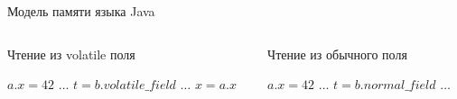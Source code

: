 \documentclass[usenames,dvipsnames,pdftex,unicode]{beamer}
\newcommand{\eng}[1]{{\English#1}}
\begin{document}
\begin{frame}{Модель памяти языка Java}
  \begin{columns}[t]
    \begin{column}{5cm}
      \begin{block}{Чтение из \eng{volatile} поля}
        \begin{algorithmic}
          \STATE $a.x = 42$
          \STATE $\ldots$
          \STATE $t = b.volatile\_field$
          \STATE $\ldots$
          \STATE $x = a.x$
        \end{algorithmic}
      \end{block}
    \end{column}
    \begin{column}{5cm}
      \begin{block}{Чтение из обычного поля}
        \begin{algorithmic}
          \STATE $a.x = 42$
          \STATE $\ldots$
          \STATE $t = b.normal\_field$
          \STATE $\ldots$
          \STATE {}
        \end{algorithmic}
      \end{block}
    \end{column}
  \end{columns}
\end{frame}
\end{document}
